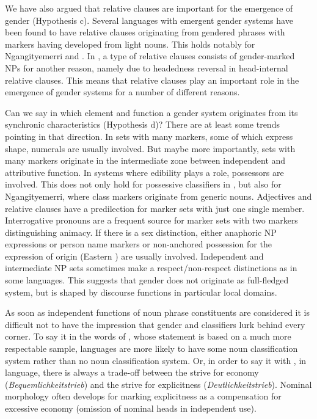 \documentclass[output=collectionpaper]{langsci/langscibook}
\begin{document}
We have also argued that relative clauses are important for the emergence of gender (Hypothesis c). Several languages with emergent gender systems have been found to have relative clauses originating from gendered phrases with markers having developed from light nouns. This holds notably for Ngan\textquotesingle{}gityemerri and . In , a type of relative clauses consists of gender-marked NPs for another reason, namely due to headedness reversal in head-internal relative clauses. This means that relative clauses play an important role in the emergence of gender systems for a number of different reasons.

Can we say in which element and function a gender system originates from its synchronic characteristics (Hypothesis d)? There are at least some trends pointing in that direction. In sets with many markers, some of which express shape, numerals are usually involved. But maybe more importantly, sets with many markers originate in the intermediate zone between independent and attributive function. In systems where edibility plays a role, possessors are involved. This does not only hold for possessive classifiers in , but also for Ngan\textquotesingle{}gityemerri, where class markers originate from generic nouns. Adjectives and relative clauses have a predilection for marker sets with just one single member. Interrogative pronouns are a frequent source for marker sets with two markers distinguishing animacy. If there is a sex distinction, either anaphoric NP expressions or person name markers or non-anchored possession for the expression of origin (Eastern ) are usually involved. Independent and intermediate NP sets sometimes make a respect/non-respect distinctions as in some  languages. This suggests that gender does not originate as full-fledged system, but is shaped by discourse functions in particular local domains.

As soon as independent functions of noun phrase constituents are considered it is difficult not to have the impression that gender and classifiers lurk behind every corner. To say it in the words of , whose statement is based on a much more respectable sample, languages are more likely to have some noun classification system rather than no noun classification system. Or, in order to say it with \cite{Gabelentz1891}, in language, there is always a trade-off between the strive for economy (\textit{Bequemlichkeitstrieb}) and the strive for explicitness (\textit{Deutlichkeitstrieb}). Nominal morphology often develops for marking explicitness as a compensation for excessive economy (omission of nominal heads in independent use).
\end{document}
